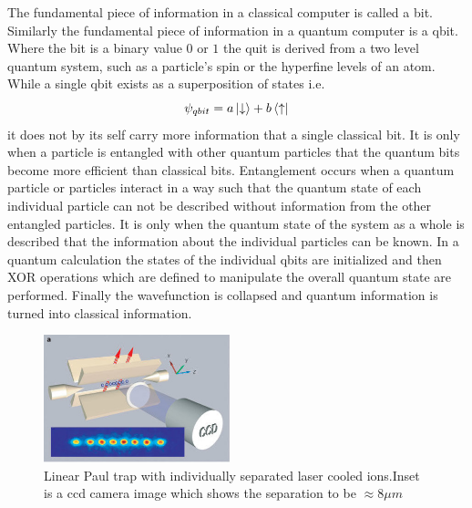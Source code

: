 \documentclass[aps,prb,twocolumn,superscriptaddress]{revtex4-1}
\begin{document}
The fundamental piece of information in a classical computer is called a bit. Similarly the fundamental piece of information in a quantum computer is a qbit. Where the bit is a binary value $0$ or $1$ the quit is derived from a two level quantum system, such as a particle's spin or the hyperfine levels of an atom. While a single qbit exists as a superposition of states i.e.
\begin{equation}
\psi_{qbit}=a\ket{\downarrow}+b\bra{\uparrow}
\end{equation}
it does not by its self carry more information that a single classical bit. It is only when a particle is entangled with other quantum particles that the quantum bits become more efficient than classical bits. Entanglement occurs when a quantum particle or particles interact in a way such that the quantum state of each individual particle can not be described without information from the other entangled particles. It is only when the quantum state of the system as a whole is described that the information about the individual particles can be known. In a quantum calculation the states of the individual qbits are initialized and then XOR operations which are defined to manipulate the overall quantum state are performed. Finally the wavefunction is collapsed and quantum information is turned into classical information.
\begin{figure}
	\begin{center}
		\includegraphics[width=0.48\textwidth]{trappedIons}
	\end{center}
	\vspace{-2mm}
	\caption{Linear Paul trap with individually separated laser cooled ions.Inset is a ccd camera image which shows the separation to be $\approx8\mu m$ \cite{esteve2013cold}}
	\label{fig:sepIons}
	\vspace{-3mm}
\end{figure}
\end{document}
